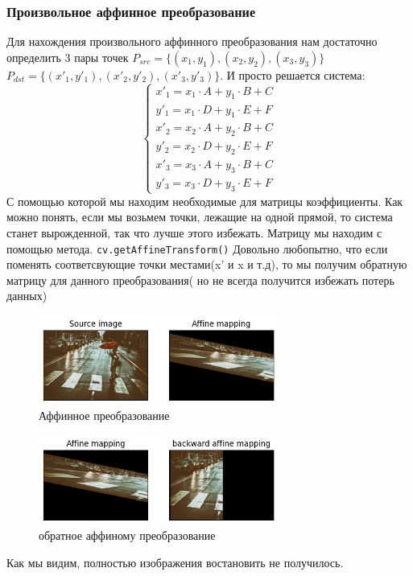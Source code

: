\documentclass[a4paper,12pt]{article}
\begin{document}
\subsubsection{Произвольное аффинное преобразование}
Для нахождения произвольного аффинного преобразования нам достаточно определить 3 пары точек $P_{src} = \lbrace(x_1, y_1), (x_2, y_2), (x_3, y_3)\rbrace$ $P_{dst} = \lbrace(x'_1, y'_1), (x'_2, y'_2), (x'_3, y'_3)\rbrace$. 
И просто решается система:
$$
	\begin{cases}
    x'_1 = x_1 \cdot A + y_1 \cdot B + C \\
    y'_1 = x_1 \cdot D + y_1 \cdot E + F \\
    x'_2 = x_2 \cdot A + y_2 \cdot B + C \\
    y'_2 = x_2 \cdot D + y_2 \cdot E + F \\
    x'_3 = x_3 \cdot A + y_3 \cdot B + C \\
    y'_3 = x_3 \cdot D + y_3 \cdot E + F
  \end{cases}
$$
С помощью которой мы находим необходимые для матрицы коэффициенты. Как можно понять, если мы возьмем точки, лежащие на одной прямой, то система станет вырожденной, так что лучше этого избежать. 
Матрицу мы находим с помощью метода.  \texttt{cv.getAffineTransform()}
Довольно любопытно, что если поменять соответсвующие точки местами(x' и x и т.д), то мы получим обратную матрицу для данного преобразования( но не всегда получится избежать потерь данных)
\begin{figure}[H]
    \centering \includegraphics[width=0.7\textwidth]{my_images/23.png}
    \caption{Аффинное преобразование}
\end{figure}
\begin{figure}[H]
    \centering \includegraphics[width=0.7\textwidth]{my_images/24.png}
    \caption{обратное аффиному преобразование}
\end{figure}
Как мы видим, полностью изображения востановить не получилось.
\end{document}
